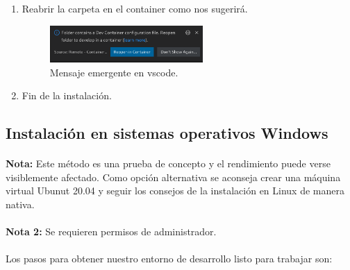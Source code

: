 \begin{enumerate}
    \item Reabrir la carpeta en el container como nos sugerirá.
    \begin{figure}[H]
        \centering
        \includegraphics[width=0.55\textwidth]{imgs/dev-container}
        \caption[Mensaje emergente en vscode]{Mensaje emergente en vscode.}
        \label{imgs:vscode-devcontainer2}
    \end{figure}

    \item Fin de la instalación.
\end{enumerate}

\subsection{Instalación en sistemas operativos Windows}

\paragraph{}\textbf{Nota:} Este método es una prueba de concepto y el rendimiento puede
verse visiblemente afectado. Como opción alternativa se aconseja crear una máquina
virtual Ubunut 20.04 y seguir los consejos de la instalación en Linux de manera nativa.

\paragraph{}\textbf{Nota 2:} Se requieren permisos de administrador.

\paragraph{}Los pasos para obtener nuestro entorno de desarrollo listo para trabajar son:

